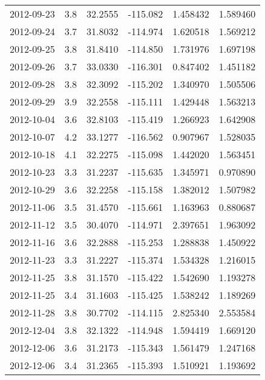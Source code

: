 \begin{tabular}{lrrrrr}
2012-09-23 &       3.8 &  32.2555 &  -115.082 &         1.458432 &         1.589460 \\
2012-09-24 &       3.7 &  31.8032 &  -114.974 &         1.620518 &         1.569212 \\
2012-09-25 &       3.8 &  31.8410 &  -114.850 &         1.731976 &         1.697198 \\
2012-09-26 &       3.7 &  33.0330 &  -116.301 &         0.847402 &         1.451182 \\
2012-09-28 &       3.8 &  32.3092 &  -115.202 &         1.340970 &         1.505506 \\
2012-09-29 &       3.9 &  32.2558 &  -115.111 &         1.429448 &         1.563213 \\
2012-10-04 &       3.6 &  32.8103 &  -115.419 &         1.266923 &         1.642908 \\
2012-10-07 &       4.2 &  33.1277 &  -116.562 &         0.907967 &         1.528035 \\
2012-10-18 &       4.1 &  32.2275 &  -115.098 &         1.442020 &         1.563451 \\
2012-10-23 &       3.3 &  31.2237 &  -115.635 &         1.345971 &         0.970890 \\
2012-10-29 &       3.6 &  32.2258 &  -115.158 &         1.382012 &         1.507982 \\
2012-11-06 &       3.5 &  31.4570 &  -115.661 &         1.163963 &         0.880687 \\
2012-11-12 &       3.5 &  30.4070 &  -114.971 &         2.397651 &         1.963092 \\
2012-11-16 &       3.6 &  32.2888 &  -115.253 &         1.288838 &         1.450922 \\
2012-11-23 &       3.3 &  31.2227 &  -115.374 &         1.534328 &         1.216015 \\
2012-11-25 &       3.8 &  31.1570 &  -115.422 &         1.542690 &         1.193278 \\
2012-11-25 &       3.4 &  31.1603 &  -115.425 &         1.538242 &         1.189269 \\
2012-11-28 &       3.8 &  30.7702 &  -114.115 &         2.825340 &         2.553584 \\
2012-12-04 &       3.8 &  32.1322 &  -114.948 &         1.594419 &         1.669120 \\
2012-12-06 &       3.6 &  31.2173 &  -115.343 &         1.561479 &         1.247168 \\
2012-12-06 &       3.4 &  31.2365 &  -115.393 &         1.510921 &         1.193692 \\

\end{tabular}
